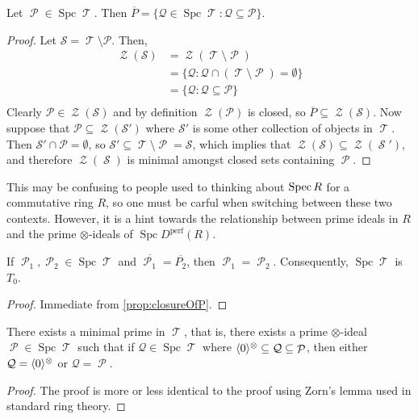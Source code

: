\documentclass[11pt]{article}
\DeclareMathOperator{\cS}{\mathcal{S}}
\DeclareMathOperator{\cZ}{\mathcal{Z}}
\DeclareMathOperator{\TT}{\mathcal{T}}
\DeclareMathOperator{\cP}{\mathcal{P}}
\DeclareMathOperator{\spc}{Spc}
\begin{document}
\begin{prop}\label{prop:closureOfP}
Let $\cP \in \spc \TT$. Then $\overline{P} = \{\mathcal{Q} \in \spc \TT: \mathcal{Q} \subseteq \mathcal{P}\}$.
\end{prop}
\begin{proof}
Let $\mathcal{S} = \TT \setminus \mathcal{P}$. Then, 
\begin{align*}
\cZ(\mathcal{S}) 	&= \cZ(\TT \setminus \cP)\\
		&= \{\mathcal{Q}: \mathcal{Q} \cap (\TT \setminus \cP) = \emptyset\}\\
		&= \{\mathcal{Q}: \mathcal{Q} \subseteq \mathcal{P}\}\\
\end{align*}
Clearly $\mathcal{P} \in \cZ(\mathcal{S})$ and by definition $\cZ(\mathcal{P})$ is closed, so $\overline{P} \subseteq \cZ(\mathcal{S})$. Now suppose that $\mathcal{P} \subseteq \cZ(\mathcal{S}')$ where $\mathcal{S}'$ is some other collection of objects in $\TT$. Then $\mathcal{S}' \cap \mathcal{P} = \emptyset$, so $\mathcal{S}' \subseteq \TT \setminus \cP = \mathcal{S}$, which implies that $\cZ(\mathcal{S}) \subseteq \cZ (\cS')$, and therefore $\cZ(\cS)$ is minimal amongst closed sets containing $\cP$.
\end{proof}

\begin{rmk}
This may be confusing to people used to thinking about $\operatorname{Spec} R$ for a commutative ring $R$, so one must be carful when switching between these two contexts. However, it is a hint towards the relationship between prime ideals in $R$ and the prime $\otimes$-ideals of $\spc D^{\text{perf}}(R)$.
\end{rmk}

\begin{cor}\label{cor:UniqueGenericPoint}
	If $\cP_1,\cP_2 \in \spc \TT$ and $\overline{\cP_1} = \overline{P_2}$, then $\cP_1 = \cP_2$. Consequently, $\spc\TT$ is $T_0$.
\end{cor}
\begin{proof}
Immediate from \autoref{prop:closureOfP}.
\end{proof}

\begin{prop}
There exists a minimal prime in $\TT$, that is, there exists a prime $\otimes$-ideal $\cP \in \spc \TT$ such that if $\mathcal{Q} \in \spc \TT$ where $\la 0 \ra^{\otimes} \subseteq\mathcal{Q} \subseteq \cP$, then either $\mathcal{Q} = \langle 0 \rangle^{\otimes}$ or $\mathcal{Q} = \cP$.
\end{prop}
\begin{proof}
	The proof is more or less identical to the proof using Zorn's lemma used in standard ring theory.
\end{proof}
\end{document}
